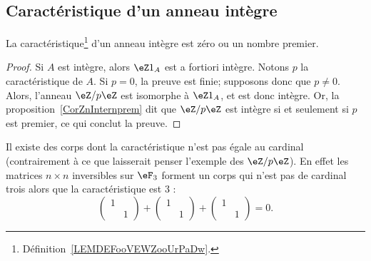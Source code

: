 \subsection{Caractéristique d'un anneau intègre}

\begin{lemma}       \label{LemCaractIntergernbrcartpre}
    La caractéristique\footnote{Définition~\ref{LEMDEFooVEWZooUrPaDw}.} d'un anneau intègre est zéro ou un nombre premier.
\end{lemma}

\begin{proof}
    Si \( A\) est intègre, alors \( \eZ 1_A\) est a fortiori intègre. Notons \( p \) la caractéristique de \( A \). Si \( p = 0 \), la preuve est finie; supposons donc que \( p \neq 0 \). Alors, l'anneau \( \eZ/p\eZ\) est isomorphe à \( \eZ 1_A\), et est donc intègre. Or, la proposition~\ref{CorZnInternprem} dit que \( \eZ/p\eZ\) est intègre si et seulement si \( p\) est premier, ce qui conclut la preuve.
\end{proof}

\begin{example}
    Il existe des corps dont la caractéristique n'est pas égale au cardinal (contrairement à ce que laisserait penser l'exemple des \( \eZ/p\eZ\)). En effet les matrices \( n\times n\) inversibles sur \( \eF_{3}\) forment un corps qui n'est pas de cardinal trois alors que la caractéristique est \( 3\) :
    \begin{equation}
        \begin{pmatrix}
            1    &       \\
                &   1
            \end{pmatrix}+\begin{pmatrix}
                1    &       \\
                    &   1
                \end{pmatrix}+\begin{pmatrix}
                    1    &       \\
                        &   1
                \end{pmatrix}=0.
    \end{equation}
\end{example}

